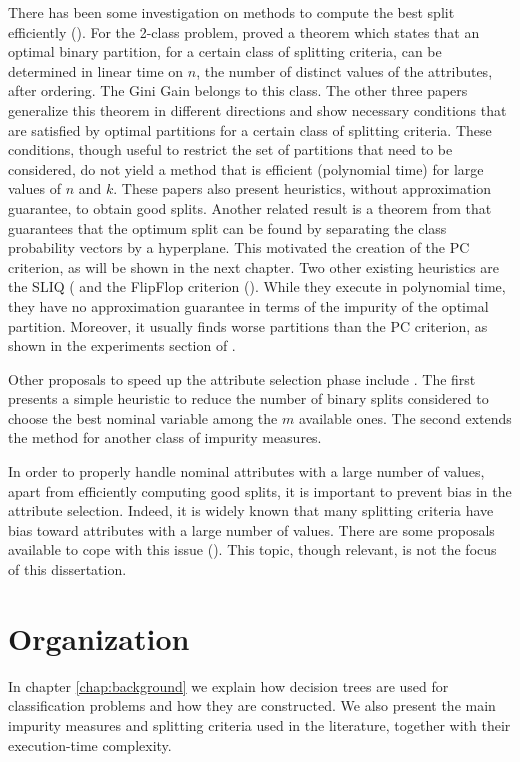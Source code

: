 There has been  some investigation on 
methods to compute the best split efficiently 
(\cite{Breiman84,Chou:91,BPKN:92,journals/datamine/CoppersmithHH99}).
For the 2-class problem,  \cite{Breiman84} proved a theorem which states that an optimal
binary partition, for a certain class of splitting criteria,
can be determined in linear time on $n$, the number of distinct values of the attributes, after ordering.
The Gini  Gain belongs to this class.
The  other  three papers generalize
this theorem  in different directions 
and show necessary conditions that are satisfied by optimal partitions for a certain class of splitting criteria. 
These conditions, though useful to restrict the set of partitions
that need to be considered, do not yield  a method that
is efficient (polynomial time) for large values of $n$ and $k$. These papers also  present  heuristics, without approximation guarantee, to obtain good splits.
Another related result is a theorem from \cite{journals/datamine/CoppersmithHH99} that guarantees that the optimum split can be found by separating the class probability vectors by a hyperplane. This motivated the creation of the PC criterion, as will be shown in the next chapter. Two other existing heuristics are the SLIQ (\cite{mehta1996sliq} and the FlipFlop criterion (\cite{nadas1991iterative}). While they execute in polynomial time, they have no approximation guarantee in terms of the impurity of the optimal partition. Moreover, it usually finds worse partitions than the PC criterion, as shown in the experiments section of \cite{journals/datamine/CoppersmithHH99}.

Other proposals to  speed up the attribute selection phase
 include  \cite{MolaSiciliano1997,Shih2001}. 
The first presents a simple  heuristic
to reduce the number of binary splits considered to
choose the best nominal variable among the $m$ available ones.
 The second   extends the method for another class
of impurity measures.

In order to properly
handle nominal attributes with a large number of values,
apart from efficiently computing good splits, it is
important to prevent bias in the attribute selection.
Indeed, it is widely  known that many splitting criteria have bias toward
attributes with a large number of values. There are some  proposals available
to cope with this issue 
(\cite{conf/icml/DobraG01,Shih2004,Hothorn:2006:URP}). 
This topic, though relevant, is not the focus of this dissertation.

\section{Organization}
\label{sec:organization}
In chapter \ref{chap:background} we explain how decision trees are used for classification problems and how they are constructed. We also present the main impurity measures and splitting criteria used in the literature, together with their execution-time complexity.

